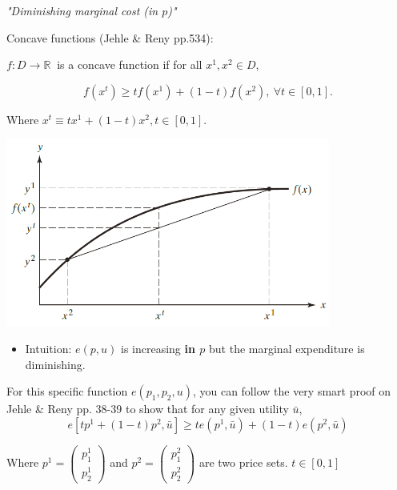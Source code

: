 \documentclass{article}
\newcommand{\R}{\mathbb{R}}
\begin{document}
\begin{mdframed}[backgroundcolor=blue!20,linecolor=white]

\textit{"Diminishing marginal cost (in $p$)"}

Concave functions (Jehle \& Reny pp.534):

$f : D \to \R \ $ is a concave function if for all $x^1, x^2 \in D$,

$$f(x^t) \ge tf(x^1) + (1 − t)f(x^2), \ \forall t \in [0, 1].$$

Where $x^t \equiv tx^1 + (1-t)x^2, t \in [0,1].$

\vspace{2mm}
{\centering
\includegraphics[width=0.8\textwidth]{2.concavef}
\label{cf}}
\vspace{2mm}


\begin{itemize}
\item Intuition: $e(p,u)$ is increasing \textbf{in $p$} but the marginal expenditure is diminishing.
\end{itemize}

For this specific function $e(p_1,p_2,u)$, you can follow the very smart proof on Jehle \& Reny pp. 38-39 to show that for any given utility $\bar{u}$, $$e[tp^1+(1-t)p^2,\bar{u}] \ge te(p^1,\bar{u}) + (1-t)e(p^2,\bar{u})$$

Where $p^1 = \left(\begin{smallmatrix}p^1_1 \\ p^1_2\end{smallmatrix}\right)$ and $p^2 = \left(\begin{smallmatrix}p^2_1 \\ p^2_2\end{smallmatrix}\right)$ are two price sets. $t \in [0,1]$

\vspace{2mm}



\end{mdframed}
\end{document}
